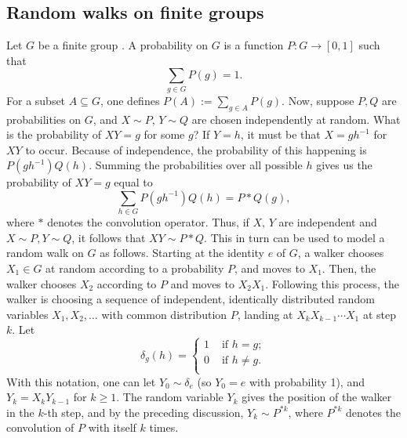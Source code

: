 \documentclass[letterpaper, 10 pt, conference]{article}
\begin{document}
\subsection{Random walks on finite groups}
Let $G$ be a finite group \citep{Herstein_1975}. A probability on $G$ is a function $P : G \longrightarrow [0,1]$  such that 
\begin{equation}
	\sum_{g \in G} P(g) = 1.
\end{equation}
For a subset $A \subseteq G$, one defines $P(A) := \sum_{g \in A} P(g)$. Now, suppose $P, Q$ are probabilities on $G$, and $X \sim P, \, Y \sim Q$ are chosen independently at random. What is the probability of $XY = g$ for some $g$? If $Y = h$, it must be that $X = gh^{-1}$ for $XY$ to occur. Because of independence, the probability of this happening is $P(gh^{-1}) Q(h)$. Summing the probabilities over all possible $h$ gives us the probability of $XY = g$ equal to
\begin{equation}
	\sum_{h \in G} P(gh^{-1}) Q(h) = P \ast Q (g),
\end{equation}
where $\ast$ denotes the convolution operator. Thus, if $X, \, Y$ are independent and $X \sim P, Y \sim Q$, it follows that $XY \sim P \ast Q$. This in turn can be used to model a random walk on $G$ as follows. Starting at the identity $e$ of $G$, a walker chooses $X_1 \in G$ at random according to a probability $P$, and moves to $X_1$. Then, the walker chooses $X_2$ according to $P$ and moves to $X_2 X_1$. Following this process, the walker is choosing a sequence of independent, identically distributed random variables $X_1, X_2, \dots$ with common distribution $P$, landing at $X_k X_{k-1} \cdots X_1$ at step $k$. Let 
\begin{equation}
\delta_g (h) = \begin{cases}
1 & \text{ if } h = g;\\
0 & \text{ if } h \neq g.\\
\end{cases}
\end{equation}
With this notation, one can let $Y_0 \sim \delta_e$ (so $Y_0 = e$ with probability 1), and $Y_k = X_k Y_{k-1}$ for $k \geq 1$. The random variable $Y_k$ gives the position of the walker in the $k$-th step, and by the preceding discussion, $Y_k \sim P^{\ast k}$, where $P^{\ast k}$ denotes the convolution of $P$ with itself $k$ times.  
\end{document}
